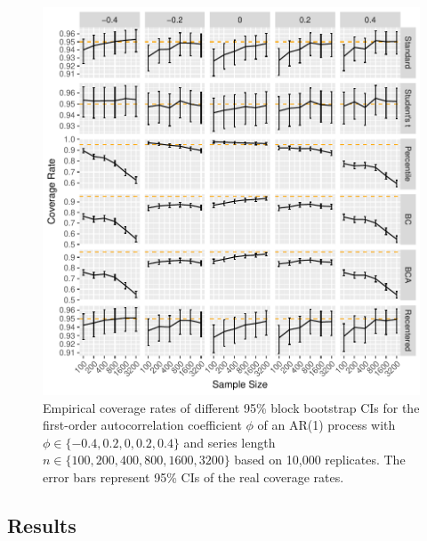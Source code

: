 \documentclass[12pt, letterpaper, titlepage]{article}
\begin{document}
\begin{figure}[tbp]
  \centering
  \includegraphics[width=\textwidth]{figures/plot_norm_phi}
  \caption{Empirical coverage rates of different 95\% block bootstrap CIs for
    the first-order autocorrelation coefficient $\phi$ of an AR(1) process with
    $\phi \in \{-0.4, 0.2, 0, 0.2, 0.4\}$ and series length
    $n \in \{100, 200, 400, 800, 1600, 3200\}$ based on 10,000 replicates. The
    error bars represent 95\% CIs of the real coverage rates.}
  \label{fig:phi}
\end{figure}


\subsection{Results}
\end{document}
